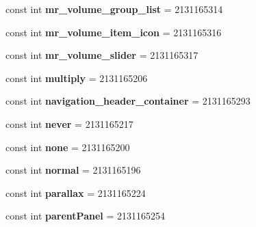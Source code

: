 \begin{DoxyCompactItemize}
\item 
\mbox{\label{classXaria_1_1Resource_1_1Id_a180abc9c7658f924d7916471627e2170}} 
const int {\bfseries mr\+\_\+volume\+\_\+group\+\_\+list} = 2131165314
\item 
\mbox{\label{classXaria_1_1Resource_1_1Id_a1dd26258c799a8500f43a936dd9ac772}} 
const int {\bfseries mr\+\_\+volume\+\_\+item\+\_\+icon} = 2131165316
\item 
\mbox{\label{classXaria_1_1Resource_1_1Id_a6c393cafa9800d94f3c66ea2afe6b064}} 
const int {\bfseries mr\+\_\+volume\+\_\+slider} = 2131165317
\item 
\mbox{\label{classXaria_1_1Resource_1_1Id_aa270449e7aea47ccd304ef9ebd0e3edc}} 
const int {\bfseries multiply} = 2131165206
\item 
\mbox{\label{classXaria_1_1Resource_1_1Id_a2be1e07679536509eb8ae255264b6f63}} 
const int {\bfseries navigation\+\_\+header\+\_\+container} = 2131165293
\item 
\mbox{\label{classXaria_1_1Resource_1_1Id_af06845872adb8ddeacf48d002921aec9}} 
const int {\bfseries never} = 2131165217
\item 
\mbox{\label{classXaria_1_1Resource_1_1Id_a8cc265d65f16893575d81a70226693e0}} 
const int {\bfseries none} = 2131165200
\item 
\mbox{\label{classXaria_1_1Resource_1_1Id_adba287b5dd3dddbe18d8e94b34f4aec9}} 
const int {\bfseries normal} = 2131165196
\item 
\mbox{\label{classXaria_1_1Resource_1_1Id_adc673925c8bc4a0f9701153e28cbeb9e}} 
const int {\bfseries parallax} = 2131165224
\item 
\mbox{\label{classXaria_1_1Resource_1_1Id_af5a3ddcf7aeb8b3842c9bab8d344e347}} 
const int {\bfseries parent\+Panel} = 2131165254
\item 

\end{DoxyCompactItemize}
